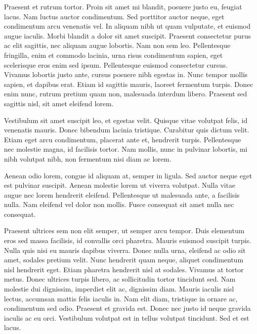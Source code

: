 Praesent et rutrum tortor. Proin sit amet mi blandit, posuere justo eu, feugiat lacus. Nam luctus auctor condimentum. Sed porttitor auctor neque, eget condimentum arcu venenatis vel. In aliquam nibh ut quam vulputate, et euismod augue iaculis. Morbi blandit a dolor sit amet suscipit. Praesent consectetur purus ac elit sagittis, nec aliquam augue lobortis. Nam non sem leo. Pellentesque fringilla, enim et commodo lacinia, urna risus condimentum sapien, eget scelerisque eros enim sed ipsum. Pellentesque euismod consectetur cursus. Vivamus lobortis justo ante, cursus posuere nibh egestas in. Nunc tempor mollis sapien, et dapibus erat. Etiam id sagittis mauris, laoreet fermentum turpis. Donec enim nunc, rutrum pretium quam non, malesuada interdum libero. Praesent sed sagittis nisl, sit amet eleifend lorem.

Vestibulum sit amet suscipit leo, et egestas velit. Quisque vitae volutpat felis, id venenatis mauris. Donec bibendum lacinia tristique. Curabitur quis dictum velit. Etiam eget arcu condimentum, placerat ante et, hendrerit turpis. Pellentesque nec molestie magna, id facilisis tortor. Nam mollis, nunc in pulvinar lobortis, mi nibh volutpat nibh, non fermentum nisi diam ac lorem.

Aenean odio lorem, congue id aliquam at, semper in ligula. Sed auctor neque eget est pulvinar suscipit. Aenean molestie lorem ut viverra volutpat. Nulla vitae augue nec lorem hendrerit eleifend. Pellentesque ut malesuada ante, a facilisis nulla. Nam eleifend vel dolor non mollis. Fusce consequat sit amet nulla nec consequat.

Praesent ultrices sem non elit semper, ut semper arcu tempor. Duis elementum eros sed massa facilisis, id convallis orci pharetra. Mauris euismod suscipit turpis. Nulla quis nisi eu mauris dapibus viverra. Donec nulla urna, eleifend ac odio sit amet, sodales pretium velit. Nunc hendrerit quam neque, aliquet condimentum nisl hendrerit eget. Etiam pharetra hendrerit nisl at sodales. Vivamus at tortor metus. Donec ultrices turpis libero, ac sollicitudin tortor tincidunt sed. Nam molestie dui dignissim, imperdiet elit ac, dignissim diam. Mauris iaculis nisl lectus, accumsan mattis felis iaculis in. Nam elit diam, tristique in ornare ac, condimentum sed odio. Praesent et gravida est. Donec nec justo id neque gravida iaculis ac eu orci. Vestibulum volutpat est in tellus volutpat tincidunt. Sed et est lacus.